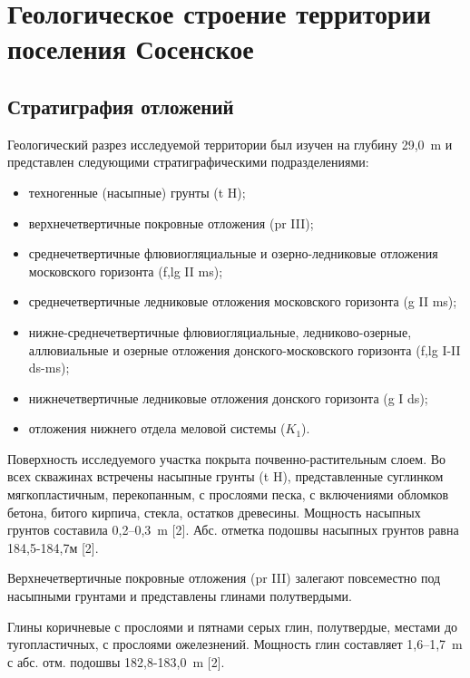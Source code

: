 \chapter{Геологическое строение территории поселения Сосенское}\label{ch:ch2}

\section{Стратиграфия отложений}\label{sec:ch2/sec1}

Геологический разрез исследуемой территории был изучен на глубину 29,0~\si{\meter} и представлен следующими стратиграфическими подразделениями:

\begin{itemize}
    \item техногенные (насыпные) грунты (t H);
    \item верхнечетвертичные покровные отложения (pr III);
    \item среднечетвертичные флювиогляциальные и озерно-ледниковые отложения московского горизонта (f,lg II ms);
    \item среднечетвертичные ледниковые отложения московского горизонта (g II ms);
    \item нижне-среднечетвертичные флювиогляциальные, ледниково-озерные, аллювиальные и озерные отложения донского-московского горизонта (f,lg I-II ds-ms);
    \item нижнечетвертичные ледниковые отложения донского горизонта (g I ds);
    \item отложения нижнего отдела меловой системы ($K_1$).
\end{itemize}


Поверхность исследуемого участка покрыта почвенно-растительным слоем. Во всех скважинах встречены насыпные грунты (t H), представленные суглинком мягкопластичным, перекопанным, с прослоями песка, с включениями обломков бетона, битого кирпича, стекла, остатков древесины. 
Мощность насыпных грунтов составила 0,2--0,3~\si{\meter} [2]. 
Абс. отметка подошвы насыпных грунтов равна 184,5-184,7м [2].

Верхнечетвертичные покровные отложения (pr III) залегают повсеместно под насыпными грунтами и представлены глинами полутвердыми.

Глины коричневые с прослоями и пятнами серых глин, полутвердые, местами до тугопластичных, с прослоями ожелезнений. 
Мощность глин составляет 1,6--1,7~\si{\meter} с абс. отм. подошвы 182,8-183,0~\si{\meter} [2].

